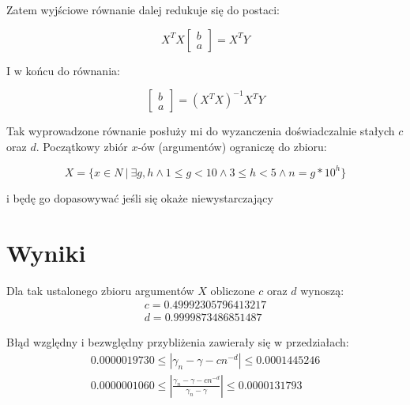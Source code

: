 \documentclass[11pt,wide]{mwart}
\begin{document}
Zatem wyjściowe równanie dalej redukuje się do postaci:

\begin{equation}
X^T X \begin{bmatrix} b \\ a \end{bmatrix} = X^T Y
\end{equation}

I w końcu do równania:

\begin{equation}
\begin{bmatrix} b \\ a \end{bmatrix} = (X^T X)^{-1} X^T Y
\end{equation}

Tak wyprowadzone równanie posłuży mi do wyzanczenia doświadczalnie stałych $c$ oraz $d$.
Początkowy zbiór $x$-ów (argumentów) ograniczę do zbioru:

\begin{equation}
X = \{ x \in N \ |\  \exists g, h \wedge 1 \le g < 10 \wedge 3 \le h < 5 \wedge n = g*10^{h}\}
\end{equation}

i będę go dopasowywać jeśli się okaże niewystarczający




\section{Wyniki}

\begin{samepage}

Dla tak ustalonego zbioru argumentów $X$ obliczone $c$ oraz $d$ wynoszą:
\begin{equation}
\begin{align}
c = 0.49992305796413217\\
d = 0.9999873486851487
\end{align}
\end{equation}

\end{samepage}

\begin{samepage}
Błąd względny i bezwględny przybliżenia zawierały się w przedziałach:
\begin{equation}
\begin{align}
0.0000019730 \le | \gamma_n - \gamma  - cn^{-d}| \le 0.0001445246\\
0.0000001060 \le | \frac{\gamma_n - \gamma  - cn^{-d}}{\gamma_n - \gamma} | \le 0.0000131793
\end{align}
\end{equation}
\end{samepage}
\end{document}

